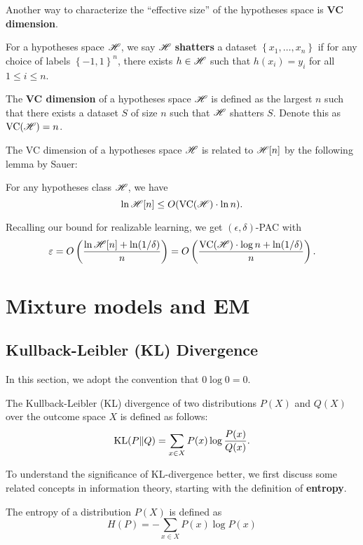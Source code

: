 \documentclass[a4paper]{article}
\begin{document}
Another way to characterize the ``effective size'' of the 
hypotheses space is \textbf{VC dimension}.

\begin{defi}[VC dimension]
  For a hypotheses space $\mathscr{H}$, we say 
  $\mathscr{H}$ \textbf{shatters} a dataset 
  $\left\{ x_1, \dots, x_n \right\}$ if 
  for any choice of labels 
  $\left\{ -1, 1 \right\}^n$, there exists 
  $h \in \mathscr{H}$ such that $h(x_i) = y_i$ 
  for all $1 \leq i \leq n$.
  
  The \textbf{VC dimension} of a hypotheses 
  space $\mathscr{H}$ is defined 
  as the largest $n$ such that there exists a dataset $S$  
  of size $n$ such that $\mathscr{H}$ shatters $S$.
  Denote this as $\operatorname{VC}(\mathscr{H}) = n$.
\end{defi}

The VC dimension of a hypotheses space $\mathscr{H}$ is 
related to $\mathscr{H}[n]$ by the following lemma by 
Sauer: 

\begin{thm}
  For any hypotheses class $\mathscr{H}$, we have 
  \[
  \ln \mathscr{H}[n] \leq O(\operatorname{VC}(\mathscr{H}) \cdot \ln n).
  \]
\end{thm}

Recalling our bound for realizable learning, we get
$(\epsilon, \delta)$-PAC with  
\[
\varepsilon = O \left( \frac{\ln \mathscr{H}[n] + \ln (1 / \delta)}{n} \right) 
= O \left( \frac{\operatorname{VC}(\mathscr{H}) \cdot \log n + \ln (1 / \delta)}{n} \right).
\]




\section{Mixture models and EM}

\subsection{Kullback-Leibler (KL) Divergence}
In this section, we adopt the convention that $0 \log 0 = 0$.

\begin{defi}[KL divergence]
  The Kullback-Leibler (KL) divergence of two  
  distributions $P(X)$ and $Q(X)$ 
  over the outcome space $X$ is defined as follows: 
  \[
  \operatorname{KL} (P \Vert Q) = \sum_{x \in X} P(x) \log \frac{P(x)}{Q(x)}.
  \]
\end{defi}

To understand the significance of KL-divergence better, 
we first discuss some related concepts in information theory,
starting with the definition of \textbf{entropy}.
\begin{defi}
  The entropy of a distribution $P(X)$ 
  is defined as 
  \[
  H(P) = - \sum_{x \in X} P(x) \log P(x)
  \]
\end{defi}
\end{document}
